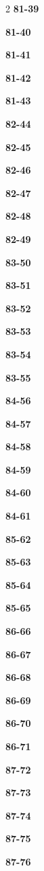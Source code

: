 \documentclass[10pt,a4paper]{article}
\begin{document}
\begin{multicols}{2}
\noindent\textbf{81-39}\ \par
\noindent\textbf{81-40}\ \par
\noindent\textbf{81-41}\ \par
\noindent\textbf{81-42}\ \par
\noindent\textbf{81-43}\ \par
\noindent\textbf{82-44}\ \par
\noindent\textbf{82-45}\ \par
\noindent\textbf{82-46}\ \par
\noindent\textbf{82-47}\ \par
\noindent\textbf{82-48}\ \par
\noindent\textbf{82-49}\ \par
\noindent\textbf{83-50}\ \par
\noindent\textbf{83-51}\ \par
\noindent\textbf{83-52}\ \par
\noindent\textbf{83-53}\ \par
\noindent\textbf{83-54}\ \par
\noindent\textbf{83-55}\ \par
\noindent\textbf{84-56}\ \par
\noindent\textbf{84-57}\ \par
\noindent\textbf{84-58}\ \par
\noindent\textbf{84-59}\ \par
\noindent\textbf{84-60}\ \par
\noindent\textbf{84-61}\ \par
\noindent\textbf{85-62}\ \par
\noindent\textbf{85-63}\ \par
\noindent\textbf{85-64}\ \par
\noindent\textbf{85-65}\ \par
\noindent\textbf{86-66}\ \par
\noindent\textbf{86-67}\ \par
\noindent\textbf{86-68}\ \par
\noindent\textbf{86-69}\ \par
\noindent\textbf{86-70}\ \par
\noindent\textbf{86-71}\ \par
\noindent\textbf{87-72}\ \par
\noindent\textbf{87-73}\ \par
\noindent\textbf{87-74}\ \par
\noindent\textbf{87-75}\ \par
\noindent\textbf{87-76}\ \par

\end{multicols}
\end{document}
